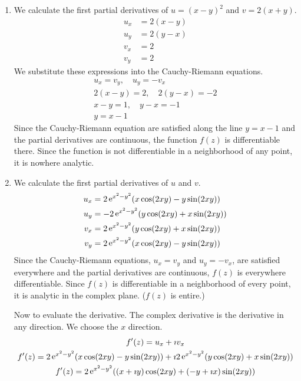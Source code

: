 {\begin{Solution}
  \label{solution cr xy2 i2xy}
  \begin{enumerate}
  \item 
    We calculate the first partial derivatives of 
    $u = (x - y)^2$ and $v = 2 (x + y)$.
    \begin{align*}
      u_x &= 2 (x - y)
      \\
      u_y &= 2 (y - x)
      \\
      v_x &= 2
      \\
      v_y &= 2
    \end{align*}
    We substitute these expressions into the Cauchy-Riemann equations.
    \begin{gather*}
      u_x = v_y, \quad u_y = - v_x
      \\
      2 (x - y) = 2, \quad 2 (y - x) = -2
      \\
      x - y = 1, \quad y - x = -1
      \\
      y = x - 1
    \end{gather*}
    Since the Cauchy-Riemann equation are satisfied along the line 
    $y = x - 1$ and the partial derivatives are continuous,
    the function $f(z)$ is differentiable there.
    Since the function is not differentiable in a neighborhood of any point, 
    it is nowhere analytic.
  \item 
    We calculate the first partial derivatives of $u$ and $v$.
    \begin{align*}
      u_x &= 2 \mathop{\mathrm{e}}\nolimits^{x^2 - y^2} ( x \cos(2 x y) - y \sin(2 x y) )
      \\
      u_y &= - 2 \mathop{\mathrm{e}}\nolimits^{x^2 - y^2} ( y \cos(2 x y) + x \sin(2 x y) )
      \\
      v_x &= 2 \mathop{\mathrm{e}}\nolimits^{x^2 - y^2} ( y \cos(2 x y) + x \sin(2 x y) )
      \\
      v_y &= 2 \mathop{\mathrm{e}}\nolimits^{x^2 - y^2} ( x \cos(2 x y) - y \sin(2 x y) )
    \end{align*}
    Since the Cauchy-Riemann equations,
    $u_x = v_y$ and $u_y = - v_x$,
    are satisfied everywhere and the partial 
    derivatives are continuous, $f(z)$ is everywhere differentiable.  Since 
    $f(z)$ is differentiable in a neighborhood of every point, it is analytic
    in the complex plane.  ($f(z)$ is entire.)

    Now to evaluate the derivative.
    The complex derivative is the derivative in any direction.  We choose the 
    $x$ direction.
    \begin{gather*}
      f'(z) = u_x + \imath v_x
      \\
      f'(z) = 2 \mathop{\mathrm{e}}\nolimits^{x^2 - y^2} ( x \cos(2 x y) - y \sin(2 x y) )
      + \imath 2 \mathop{\mathrm{e}}\nolimits^{x^2 - y^2} ( y \cos(2 x y) + x \sin(2 x y) )
      \\
      f'(z) = 2 \mathop{\mathrm{e}}\nolimits^{x^2 - y^2} ( (x + \imath y) \cos(2 x y) 
      + (-y + \imath x) \sin(2 x y) )
    \end{gather*}


\end{enumerate}
\end{Solution}}
